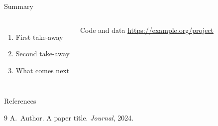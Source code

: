 \documentclass[aspectratio=169]{beamer}
\begin{document}
\begin{frame}{Summary}
  \begin{columns}[T]
      \begin{enumerate}
        \item<1-> First take-away
        \item<2-> Second take-away
        \item<3-> What comes next
      \end{enumerate}
      \begin{block}{Code and data}
        \url{https://example.org/project}
      \end{block}
  \end{columns}
\end{frame}

\begin{frame}{References}
  \begin{thebibliography}{9}
     A.~Author. \newblock A paper title. \newblock \emph{Journal}, 2024.
  \end{thebibliography}
\end{frame}
\end{document}
